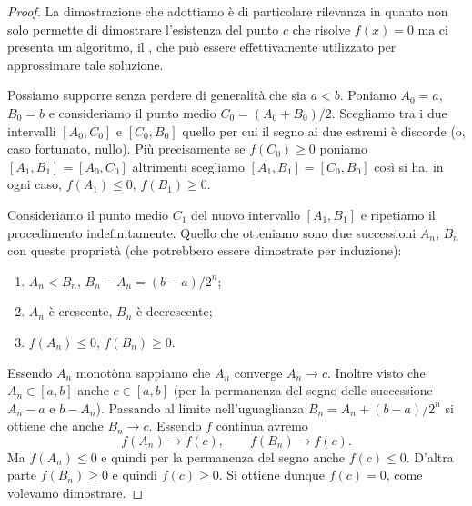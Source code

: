 \begin{proof}
\mymark{***}
La dimostrazione che adottiamo è di particolare rilevanza in quanto
non solo permette di dimostrare l'esistenza del punto $c$ che risolve
$f(x)=0$
ma ci presenta
un algoritmo, il ,
che può essere effettivamente utilizzato per approssimare
tale soluzione.

Possiamo supporre senza perdere di  generalità che sia $a<b$.
Poniamo $A_0 = a$, $B_0= b$ e consideriamo il punto medio $C_0 = (A_0+B_0)/2$.
Scegliamo tra i due intervalli $[A_0, C_0]$ e $[C_0,B_0]$ quello per cui
il segno ai due estremi è discorde (o, caso fortunato, nullo).
Più precisamente se $f(C_0)\ge 0$ poniamo $[A_1,B_1] = [A_0,C_0]$ altrimenti
scegliamo $[A_1,B_1] = [C_0,B_0]$ così si ha, in ogni caso,
$f(A_1)\le 0$, $f(B_1)\ge 0$.

Consideriamo il punto medio $C_1$ del nuovo intervallo $[A_1,B_1]$ e ripetiamo
il procedimento indefinitamente. Quello che otteniamo sono due successioni
$A_n$, $B_n$ con queste proprietà (che potrebbero essere dimostrate per induzione):
\begin{enumerate}
\item $A_n < B_n$, $B_n - A_n = (b-a)/2^n$;
\item $A_n$ è crescente, $B_n$ è decrescente;
\item $f(A_n)\le 0$, $f(B_n)\ge 0$.
\end{enumerate}

Essendo $A_n$ monotòna sappiamo che $A_n$ converge $A_n\to c$.
Inoltre visto che $A_n \in [a,b]$ anche $c\in [a,b]$ (per la permanenza del
segno delle successione $A_n-a$ e $b-A_n$).
Passando al limite nell'uguaglianza $B_n = A_n + (b-a)/2^n$
si ottiene che anche $B_n \to c$. Essendo $f$ continua
avremo
\[
f(A_n) \to f(c), \qquad
f(B_n) \to f(c).
\]
Ma $f(A_n)\le 0$ e quindi per la permanenza del segno anche $f(c)\le 0$.
D'altra parte $f(B_n) \ge 0$ e quindi $f(c)\ge 0$.
Si ottiene dunque $f(c) = 0$, come volevamo dimostrare.
\end{proof}

